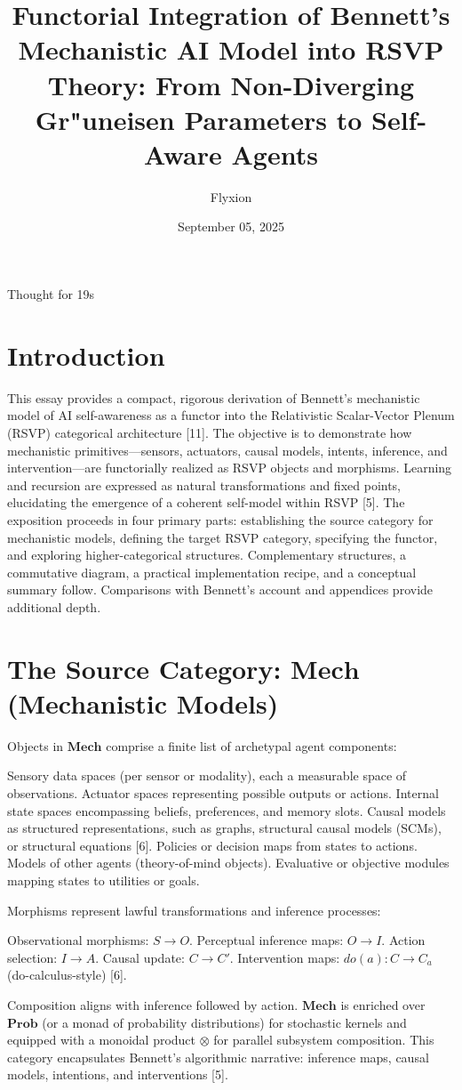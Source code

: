 Thought for 19s\documentclass{article}
\title{Functorial Integration of Bennett's Mechanistic AI Model into RSVP Theory: From Non-Diverging Gr"uneisen Parameters to Self-Aware Agents}
\author{Flyxion}
\date{September 05, 2025}
\begin{document}
\maketitle
\section{Introduction}
This essay provides a compact, rigorous derivation of Bennett's mechanistic model of AI self-awareness as a functor into the Relativistic Scalar-Vector Plenum (RSVP) categorical architecture [11]. The objective is to demonstrate how mechanistic primitives—sensors, actuators, causal models, intents, inference, and intervention—are functorially realized as RSVP objects and morphisms. Learning and recursion are expressed as natural transformations and fixed points, elucidating the emergence of a coherent self-model within RSVP [5].
The exposition proceeds in four primary parts: establishing the source category for mechanistic models, defining the target RSVP category, specifying the functor, and exploring higher-categorical structures. Complementary structures, a commutative diagram, a practical implementation recipe, and a conceptual summary follow. Comparisons with Bennett's account and appendices provide additional depth.
\section{The Source Category: $\mathbf{Mech}$ (Mechanistic Models)}
Objects in $\mathbf{Mech}$ comprise a finite list of archetypal agent components:

Sensory data spaces (per sensor or modality), each a measurable space of observations.
Actuator spaces representing possible outputs or actions.
Internal state spaces encompassing beliefs, preferences, and memory slots.
Causal models as structured representations, such as graphs, structural causal models (SCMs), or structural equations [6].
Policies or decision maps from states to actions.
Models of other agents (theory-of-mind objects).
Evaluative or objective modules mapping states to utilities or goals.

Morphisms represent lawful transformations and inference processes:

Observational morphisms: $S \to O$.
Perceptual inference maps: $O \to I$.
Action selection: $I \to A$.
Causal update: $C \to C'$.
Intervention maps: $do(a): C \to C_a$ (do-calculus-style) [6].

Composition aligns with inference followed by action. $\mathbf{Mech}$ is enriched over $\mathbf{Prob}$ (or a monad of probability distributions) for stochastic kernels and equipped with a monoidal product $\otimes$ for parallel subsystem composition.
This category encapsulates Bennett's algorithmic narrative: inference maps, causal models, intentions, and interventions [5].
\end{document}
